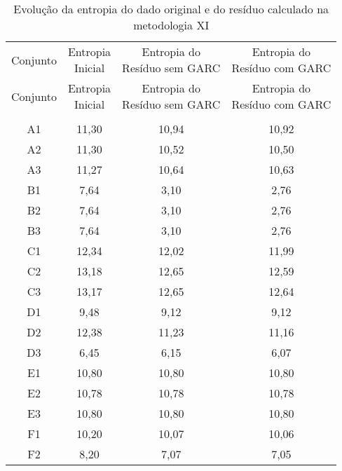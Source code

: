 \begin{center}
\begin{longtable}{cccc}
\toprule
\rowcolor{white}
\caption[Metodologia XI: evolução da entropia]{Evolução da entropia do dado
original e do resíduo calculado na metodologia XI}
\label{tab:EvolucaoEntropiaMet11}\\
\midrule
Conjunto & \specialcell{Entropia \\Inicial} & \specialcell{Entropia do
\\Resíduo sem GARC} & \specialcell{Entropia do
\\Resíduo com GARC}  \\
\midrule
\endfirsthead
\midrule
\rowcolor{white}
Conjunto & \specialcell{Entropia \\Inicial} & \specialcell{Entropia do
\\Resíduo sem GARC} & \specialcell{Entropia do
\\Resíduo com GARC}  \\
\toprule
\endhead
\midrule \\ %
\endfoot
\bottomrule 
\endlastfoot
    A1    & 11,30 & 10,94 & 10,92 \\
    A2    & 11,30 & 10,52 & 10,50 \\
    A3    & 11,27 & 10,64 & 10,63 \\
    B1    & 7,64  & 3,10  & 2,76 \\
    B2    & 7,64  & 3,10  & 2,76 \\
    B3    & 7,64  & 3,10  & 2,76 \\
    C1    & 12,34 & 12,02 & 11,99 \\
    C2    & 13,18 & 12,65 & 12,59 \\
    C3    & 13,17 & 12,65 & 12,64 \\
    D1    & 9,48  & 9,12  & 9,12 \\
    D2    & 12,38 & 11,23 & 11,16 \\
    D3    & 6,45  & 6,15  & 6,07 \\
    E1    & 10,80 & 10,80 & 10,80 \\
    E2    & 10,78 & 10,78 & 10,78 \\
    E3    & 10,80 & 10,80 & 10,80 \\
    F1    & 10,20 & 10,07 & 10,06 \\
    F2    & 8,20  & 7,07  & 7,05 \\

\end{longtable}
\end{center}
